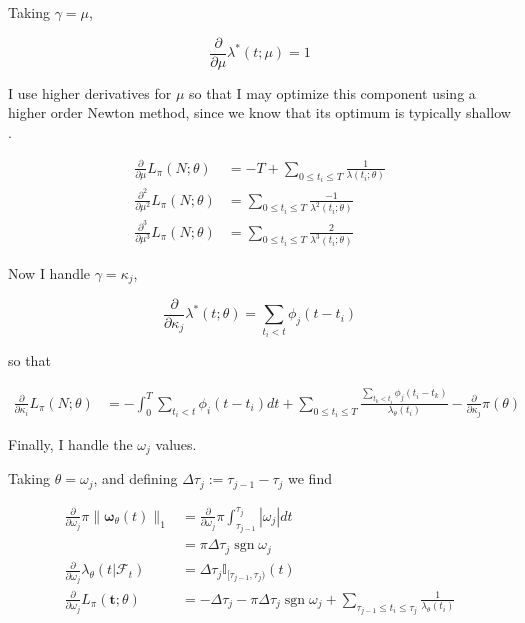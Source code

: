 \documentclass[11pt]{article}
\def\lt{<}
\begin{document}
    Taking \(\gamma=\mu\),

\[{ \scriptstyle \frac{\partial}{\partial\mu} }\lambda^*(t;\mu) = 1\]

I use higher derivatives for \(\mu\) so that I may optimize this
component using a higher order Newton method, since we know that its
optimum is typically shallow \cite{veen_estimation_2008}.

\[\begin{aligned}
  { \scriptstyle \frac{\partial}{\partial\mu} } L_\pi(N;\theta) &=-T + \sum_{0\leq t_i\leq T} \frac{1}{\lambda(t_i;\theta)} \\
  { \scriptstyle \frac{\partial^2}{\partial\mu^2} } L_\pi(N;\theta) &= \sum_{0\leq t_i\leq T} \frac{-1}{\lambda^2(t_i;\theta)}\\
  { \scriptstyle \frac{\partial^3}{\partial\mu^3} } L_\pi(N;\theta) &= \sum_{0\leq t_i\leq T} \frac{2}{\lambda^3(t_i;\theta)}
  \end{aligned}\]

    Now I handle \(\gamma=\kappa_j\),

\[{ \scriptstyle \frac{\partial}{\partial\kappa_j} }\lambda^*(t;\theta) =  \sum_{t_i\lt t}\phi_j(t-t_i)\]

so that

\[\begin{aligned}
  { \scriptstyle \frac{\partial}{\partial\kappa_i} } L_\pi(N; \theta)&=-\int_0^T \sum_{t_i\lt t}\phi_i(t-t_i) dt + \sum_{0\leq t_i\leq T} \frac{\sum_{t_k\lt t_i}\phi_j(t_i-t_k)}{\lambda_\theta(t_i)} -\frac{\partial}{\partial\kappa_j}\pi(\theta)
\end{aligned}\]

    Finally, I handle the \(\omega_j\) values.

Taking \(\theta=\omega_j\), and defining
\(\Delta\tau_j:= {\tau_{j-1}}-{\tau_j}\) we find

\[\begin{aligned}
{ \scriptstyle \frac{\partial}{\partial\omega_j} }\pi\|\boldsymbol \omega_\theta(t)\|_1 &= { \scriptstyle \frac{\partial}{\partial\omega_j} }\pi \int_{\tau_{j-1}}^{\tau_j} \left|\omega_j\right|dt\\
&=\pi\Delta\tau_j\operatorname{sgn} \omega_j\\
{ \scriptstyle \frac{\partial}{\partial\omega_j} }\lambda_\theta(t|\mathcal{F}_t) &=  \Delta\tau_j\mathbb{I}_{[\tau_{j-1},\tau_j)}(t)\\
{ \scriptstyle \frac{\partial}{\partial\omega_j} } L_\pi(\mathbf t;\theta) &=-\Delta\tau_j-\pi\Delta\tau_j\operatorname{sgn} \omega_j + \sum_{\tau_{j-1}\leq t_i\leq \tau_j} \frac{1}{\lambda_\theta(t_i)}
\end{aligned}\]
\end{document}
